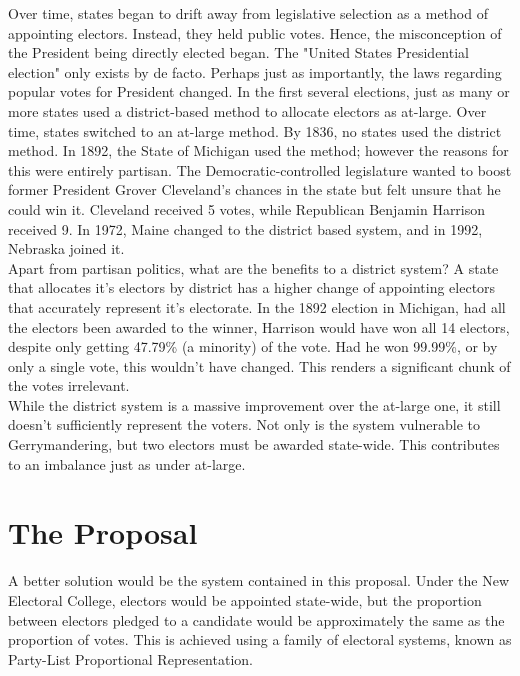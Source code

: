 \documentclass{article}
\begin{document}
    Over time, states began to drift away from legislative selection as a method of appointing electors. Instead, they held public votes. Hence, the misconception of the President being directly elected began. The "United States Presidential election" only exists by de facto. Perhaps just as importantly, the laws regarding popular votes for President changed. In the first several elections, just as many or more states used a district-based method to allocate electors as at-large. Over time, states switched to an at-large method. By 1836, no states used the district method. In 1892, the State of Michigan used the method; however the reasons for this were entirely partisan. The Democratic-controlled legislature wanted to boost former President Grover Cleveland's chances in the state but felt unsure that he could win it. Cleveland received 5 votes, while Republican Benjamin Harrison received 9. In 1972, Maine changed to the district based system, and in 1992, Nebraska joined it. \\

    Apart from partisan politics, what are the benefits to a district system? A state that allocates it's electors by district has a higher change of appointing electors that accurately represent it's electorate. In the 1892 election in Michigan, had all the electors been awarded to the winner, Harrison would have won all 14 electors, despite only getting 47.79\% (a minority) of the vote. Had he won 99.99\%, or by only a single vote, this wouldn't have changed. This renders a significant chunk of the votes irrelevant. \\

    While the district system is a massive improvement over the at-large one, it still doesn't sufficiently represent the voters. Not only is the system vulnerable to Gerrymandering, but two electors must be awarded state-wide. This contributes to an imbalance just as under at-large. \\

    \section{The Proposal}%

    A better solution would be the system contained in this proposal. Under the New Electoral College, electors would be appointed state-wide, but the proportion between electors pledged to a candidate would be approximately the same as the proportion of votes. This is achieved using a family of electoral systems, known as Party-List Proportional Representation. \\
\end{document}

